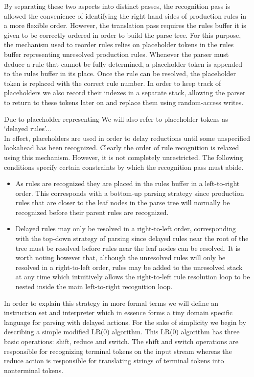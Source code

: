 \documentclass[a4paper,11pt]{article}
\begin{document}
By separating these two aspects into distinct passes, the recognition pass is allowed the convenience of identifying the right hand sides of production rules in a more flexible order. 
However, the translation pass requires the rules buffer it is given to be correctly ordered in order to build the parse tree.
For this purpose, the mechanism used to reorder rules relies on placeholder tokens in the rules buffer representing unresolved production rules.
Whenever the parser must deduce a rule that cannot be fully determined, a placeholder token is appended to the rules buffer in its place. 
Once the rule can be resolved, the placeholder token is replaced with the correct rule number. 
In order to keep track of placeholders we also record their indexes in a separate stack, allowing the parser to return to these tokens later on and replace them using random-access writes.


Due to placeholder representing We will also refer to placeholder tokens as `delayed rules'...\\


In effect, placeholders are used in order to delay reductions until some unspecified lookahead has been recognized.
Clearly the order of rule recognition is relaxed using this mechanism. However, it is not completely unrestricted. 
The following conditions specify certain constraints by which the recognition pass must abide.

\begin{itemize}
\item As rules are recognized they are placed in the rules buffer in a left-to-right order. This corresponds with a bottom-up parsing strategy since production rules that are closer to the leaf nodes in the parse tree will normally be recognized before their parent rules are recognized.
\item Delayed rules may only be resolved in a right-to-left order, corresponding with the top-down strategy of parsing since delayed rules near the root of the tree must be resolved before 
rules near the leaf nodes can be resolved. 
It is worth noting however that, although the unresolved rules will only be resolved in a right-to-left order, rules may be added to the unresolved stack at any time which intuitively
allows the right-to-left rule resolution loop to be nested inside the main left-to-right recognition loop.
\end{itemize}

In order to explain this strategy in more formal terms we will define an instruction set and interpreter which in essence forms a tiny domain specific language for parsing with delayed actions.
For the sake of simplicity we begin by describing a simple modified LR(0) algorithm. This LR(0) algorithm has three basic operations: shift, reduce and switch. 
The shift and switch operations are responsible for recognizing terminal tokens on the input stream whereas the reduce action is responsible for translating strings of terminal tokens into nonterminal tokens.
\end{document}
